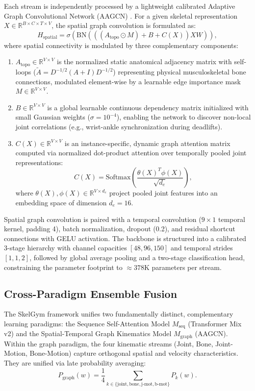 \documentclass[runningheads]{llncs}
\begin{document}
Each stream is independently processed by a lightweight calibrated Adaptive Graph Convolutional Network (AAGCN) \cite{shi2020skeleton}. For a given skeletal representation $X \in \mathbb{R}^{B \times C \times T \times V}$, the spatial graph convolution is formulated as:
\begin{equation}
    H_{\text{spatial}} = \sigma\left( \mathrm{BN}\left( \left( (A_{\text{topo}} \odot M) + B + C(X) \right) X W \right) \right),
\end{equation}
where spatial connectivity is modulated by three complementary components:
\begin{enumerate}
    \item $A_{\text{topo}} \in \mathbb{R}^{V \times V}$ is the normalized static anatomical adjacency matrix with self-loops ($\tilde{A} = D^{-1/2}(A + I)D^{-1/2}$) representing physical musculoskeletal bone connections, modulated element-wise by a learnable edge importance mask $M \in \mathbb{R}^{V \times V}$.
    \item $B \in \mathbb{R}^{V \times V}$ is a global learnable continuous dependency matrix initialized with small Gaussian weights ($\sigma = 10^{-4}$), enabling the network to discover non-local joint correlations (e.g., wrist-ankle synchronization during deadlifts).
    \item $C(X) \in \mathbb{R}^{V \times V}$ is an instance-specific, dynamic graph attention matrix computed via normalized dot-product attention over temporally pooled joint representations:
    \begin{equation}
        C(X) = \mathrm{Softmax}\left( \frac{\theta(X)^T \phi(X)}{\sqrt{d_e}} \right),
    \end{equation}
    where $\theta(X), \phi(X) \in \mathbb{R}^{V \times d_e}$ project pooled joint features into an embedding space of dimension $d_e = 16$.
\end{enumerate}
Spatial graph convolution is paired with a temporal convolution ($9 \times 1$ temporal kernel, padding 4), batch normalization, dropout (0.2), and residual shortcut connections with GELU activation. The backbone is structured into a calibrated 3-stage hierarchy with channel capacities $[48, 96, 150]$ and temporal strides $[1, 1, 2]$, followed by global average pooling and a two-stage classification head, constraining the parameter footprint to $\approx 378\text{K}$ parameters per stream.

\subsection{Cross-Paradigm Ensemble Fusion}
The SkelGym framework unifies two fundamentally distinct, complementary learning paradigms: the Sequence Self-Attention Model $M_{\text{seq}}$ (Transformer Mix v2) and the Spatial-Temporal Graph Kinematics Model $M_{\text{graph}}$ (AAGCN). Within the graph paradigm, the four kinematic streams (Joint, Bone, Joint-Motion, Bone-Motion) capture orthogonal spatial and velocity characteristics. They are unified via late probability averaging:
\begin{equation}
    P_{\text{graph}}(w) = \frac{1}{4} \sum_{k \in \{\text{joint}, \text{bone}, \text{j-mot}, \text{b-mot}\}} P_k(w).
\end{equation}
\end{document}
